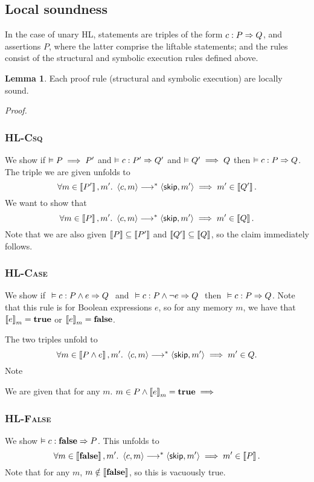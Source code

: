 \documentclass[10pt]{article}
\theoremstyle{definition}
\newtheorem{lemma}{Lemma}
\begin{document}
\subsection*{Local soundness}
In the case of unary HL,
statements are triples of the form
$\Triple c : P => Q$, and
assertions $P$,
where the latter comprise the liftable statements;
and the rules consist of the structural and symbolic execution rules defined above.


\begin{lemma}
    Each proof rule (structural and symbolic execution) are locally sound.
\end{lemma}

\noindent
\emph{Proof.}

\subsubsection*{\textsc{HL-Csq}}
We show if $\vDash P \implies P'$ and 
      $\VAL \Triple c : P' => Q'$ and 
      $\vDash Q' \implies Q$
then $\VAL \Triple c : P => Q$.
The triple we are given unfolds to
\[
    \forall m \in \Interp{P'}, m'.\
    \Cfg(c, m) \sstepstotrans \Cfg(\Skip, m')
    \implies m' \in \Interp{Q'}.
\]
We want to show that
\[
    \forall m \in \Interp P, m'.\
    \Cfg(c, m) \sstepstotrans \Cfg(\Skip, m')
    \implies m' \in \Interp Q.
\]
Note that we are also given $\left\llbracket P \right\rrbracket \subseteq \left\llbracket P' \right\rrbracket$ and $\left\llbracket Q' \right\rrbracket \subseteq \left\llbracket Q \right\rrbracket$,
so the claim immediately follows.

\subsubsection*{\textsc{HL-Case}}
We show if $\ \VAL \Triple c : P \wedge e => Q\ $ and
      $\ \VAL \Triple c : P \wedge \neg e => Q\ $ then
    $\ \VAL \Triple c : P => Q$.
Note that this rule is for Boolean expressions $e$,
so for any memory $m$, we have that $\Eval(e,m) = \True$
or $\Eval(e,m) = \False$.

The two triples unfold to
\[
    \forall m \in \Interp{P \wedge e}, m'.\
    \Cfg(c, m) \sstepstotrans \Cfg(\Skip, m') 
    \implies m' \in Q.
\]
Note

We are given that for any $m$. $m \in P \wedge \Eval(e,m) = \True \implies $

\subsubsection*{\textsc{HL-False}}
We show $\VAL \Triple c : \EFalse => P$.
This unfolds to
\[
    \forall m \in \Interp{\EFalse}, m'.\
    \Cfg(c, m) \sstepstotrans \Cfg(\Skip, m') 
    \implies m' \in \Interp{P}.
\]
Note that for any $m$, $m \notin \left\llbracket \textbf{false} \right\rrbracket$,
so this is vacuously true.
\end{document}
